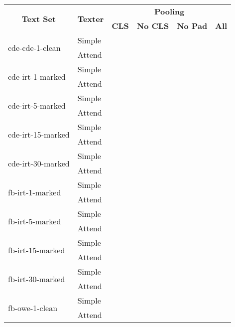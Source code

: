 \begin{tabular}{| l | l | r | r | r | r |}
    \hline

    \multicolumn{1}{|c|}{\multirow{2}{*}{\textbf{Text Set}}} &
    \multicolumn{1}{|c|}{\multirow{2}{*}{\textbf{Texter}}} &
    \multicolumn{4}{|c|}{\textbf{Pooling}} \\

    &
    &
    \multicolumn{1}{|c|}{\textbf{CLS}} &
    \multicolumn{1}{|c|}{\textbf{No CLS}} &
    \multicolumn{1}{|c|}{\textbf{No Pad}} &
    \multicolumn{1}{|c|}{\textbf{All}} \\

    \hline \hline

    \multirow{2}{*}{cde-cde-1-clean}
    & Simple &  &  &  &  \\
    & Attend &  &  &  &  \\ \hline

    \multirow{2}{*}{cde-irt-1-marked}
    & Simple &  &  &  &  \\
    & Attend &  &  &  &  \\ \hline

    \multirow{2}{*}{cde-irt-5-marked}
    & Simple &  &  &  &  \\
    & Attend &  &  &  &  \\ \hline

    \multirow{2}{*}{cde-irt-15-marked}
    & Simple &  &  &  &  \\
    & Attend &  &  &  &  \\ \hline

    \multirow{2}{*}{cde-irt-30-marked}
    & Simple &  &  &  &  \\
    & Attend &  &  &  &  \\ \hline \hline

    \multirow{2}{*}{fb-irt-1-marked}
    & Simple &  &  &  &  \\
    & Attend &  &  &  &  \\ \hline

    \multirow{2}{*}{fb-irt-5-marked}
    & Simple &  &  &  &  \\
    & Attend &  &  &  &  \\ \hline

    \multirow{2}{*}{fb-irt-15-marked}
    & Simple &  &  &  &  \\
    & Attend &  &  &  &  \\ \hline

    \multirow{2}{*}{fb-irt-30-marked}
    & Simple &  &  &  &  \\
    & Attend &  &  &  &  \\ \hline

    \multirow{2}{*}{fb-owe-1-clean}
    & Simple &  &  &  &  \\
    & Attend &  &  &  &  \\ \hline

\end{tabular}
